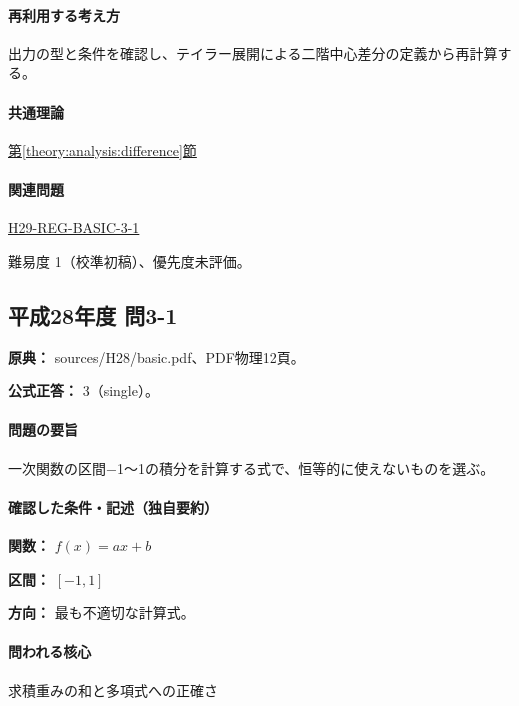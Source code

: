 \paragraph{再利用する考え方} 出力の型と条件を確認し、テイラー展開による二階中心差分の定義から再計算する。

\paragraph{共通理論} \hyperref[theory:analysis:difference]{第\ref*{theory:analysis:difference}節}

\paragraph{関連問題} \hyperref[q:h29-reg-basic-3-1]{H29-REG-BASIC-3-1}

\par 難易度 1（校準初稿）、優先度未評価。

\subsection{平成28年度 問3-1}
\label{q:h28-reg-basic-3-1}

\noindent\textbf{原典：} sources/H28/basic.pdf、PDF物理12頁。

\textbf{公式正答：} 3（single）。

\paragraph{問題の要旨} 一次関数の区間−1〜1の積分を計算する式で、恒等的に使えないものを選ぶ。

\paragraph{確認した条件・記述（独自要約）}\mbox{}\par

\noindent\textbf{関数：} \(f(x)=ax+b\)\par

\noindent\textbf{区間：} \([-1,1]\)\par

\noindent\textbf{方向：} 最も不適切な計算式。\par

\paragraph{問われる核心} 求積重みの和と多項式への正確さ

